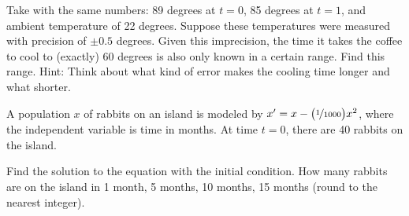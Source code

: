 \begin{exercise}\ansMark%
Take  with the same numbers: 89 degrees at
$t=0$, 85 degrees at $t=1$, and ambient temperature
of 22 degrees.  Suppose these temperatures were measured with precision of
$\pm 0.5$ degrees.  Given this imprecision, the time
it takes the coffee to cool to (exactly) 60 degrees is also only known in a
certain range.  Find this range.  Hint: Think about what kind of error makes
the cooling time longer and what shorter.
\end{exercise}

\begin{exercise}\ansMark%
A population $x$ of rabbits on an island is modeled by
$x' = x- \bigl(\nicefrac{1}{1000} \bigr) x^2$, where the independent
variable is time in months.  At time $t=0$, there are 40 rabbits
on the island.
\begin{tasks}
\task Find the solution to the equation with the initial
condition.
\task
How many rabbits are on the island in 1 month, 5 months, 
10 months, 15 months (round to the nearest integer).
\end{tasks}
\end{exercise}

\setcounter{exercise}{100}



